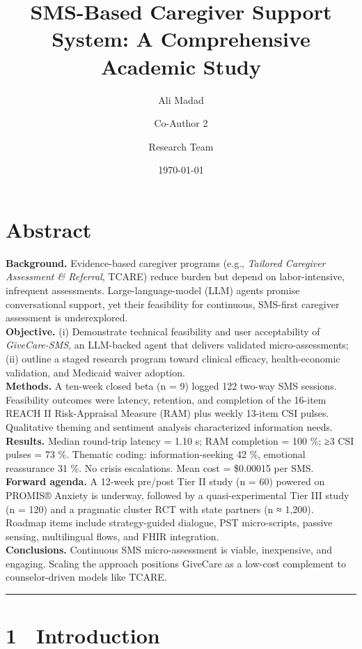 \documentclass[
]{article}
\title{SMS-Based Caregiver Support System: A Comprehensive Academic Study}
\author{Ali Madad \and Co-Author 2 \and Research Team}
\date{\today}
\begin{document}
\maketitle

\section{Abstract}\label{abstract}

\textbf{Background.} Evidence-based caregiver programs (e.g.,
\emph{Tailored Caregiver Assessment \& Referral}, TCARE) reduce burden
but depend on labor-intensive, infrequent assessments.
Large-language-model (LLM) agents promise conversational support, yet
their feasibility for continuous, SMS-first caregiver assessment is
underexplored.\\
\textbf{Objective.} (i) Demonstrate technical feasibility and user
acceptability of \emph{GiveCare-SMS}, an LLM-backed agent that delivers
validated micro-assessments; (ii) outline a staged research program
toward clinical efficacy, health-economic validation, and Medicaid
waiver adoption.\\
\textbf{Methods.} A ten-week closed beta (n = 9) logged 122 two-way SMS
sessions. Feasibility outcomes were latency, retention, and completion
of the 16-item REACH II Risk-Appraisal Measure (RAM) plus weekly 13-item
CSI pulses. Qualitative theming and sentiment analysis characterized
information needs.\\
\textbf{Results.} Median round-trip latency = 1.10 s; RAM completion =
100 \%; ≥3 CSI pulses = 73 \%. Thematic coding: information-seeking 42
\%, emotional reassurance 31 \%. No crisis escalations. Mean cost =
\$0.00015 per SMS.\\
\textbf{Forward agenda.} A 12-week pre/post Tier II study (n = 60)
powered on PROMIS® Anxiety is underway, followed by a quasi-experimental
Tier III study (n = 120) and a pragmatic cluster RCT with state partners
(n ≈ 1,200). Roadmap items include strategy-guided dialogue, PST
micro-scripts, passive sensing, multilingual flows, and FHIR
integration.\\
\textbf{Conclusions.} Continuous SMS micro-assessment is viable,
inexpensive, and engaging. Scaling the approach positions GiveCare as a
low-cost complement to counselor-driven models like TCARE.

\begin{center}\rule{0.5\linewidth}{0.5pt}\end{center}

\section{1 Introduction}\label{introduction}
\end{document}
